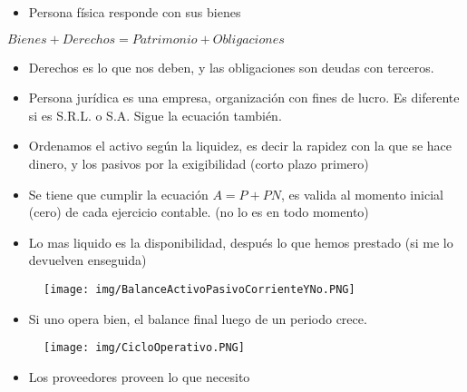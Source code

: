 \documentclass[titlepage,a4paper]{article}
\begin{document}
\begin{itemize}
\item Persona física responde con sus bienes
\end{itemize}

\begin{center}
\begin{math}
Bienes + Derechos = Patrimonio + Obligaciones
\end{math}
\end{center}

\begin{itemize}
\item Derechos es lo que nos deben, y las obligaciones son deudas con terceros.
\item Persona jurídica es una empresa, organización con fines de lucro. Es diferente si es S.R.L. o S.A. Sigue la ecuación también.
\end{itemize}
\begin{itemize}
\item Ordenamos el activo según la liquidez, es decir la rapidez con la que se hace dinero, y los pasivos por la exigibilidad (corto plazo primero)
\item Se tiene que cumplir la ecuación $A = P + PN$, es valida al momento inicial (cero) de cada ejercicio contable. (no lo es en todo momento)
\item Lo mas liquido es la disponibilidad, después lo que hemos prestado (si me lo devuelven enseguida)
\end{itemize}

\begin{figure}[!htb]
    \centering
    \texttt{[image: img/BalanceActivoPasivoCorrienteYNo.PNG]}
\end{figure}

\begin{itemize}
\item Si uno opera bien, el balance final luego de un periodo crece.
\end{itemize}

\begin{figure}[!htb]
    \centering
    \texttt{[image: img/CicloOperativo.PNG]}
\end{figure}
 
\begin{itemize}
\item Los proveedores proveen lo que necesito
\end{itemize}
\end{document}
